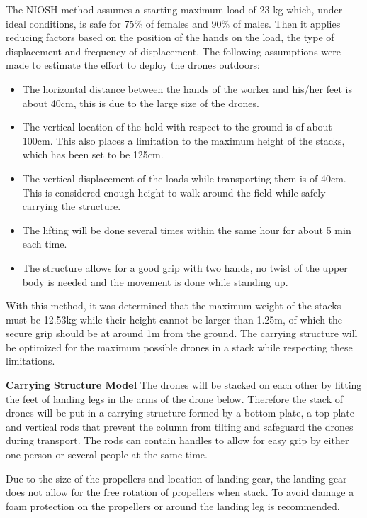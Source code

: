 The NIOSH method assumes a starting maximum load of 23 kg which, under ideal conditions, is safe for 75\% of females and 90\% of males. Then it applies reducing factors based on the position of the hands on the load, the type of displacement and frequency of displacement. The following assumptions were made to estimate the effort to deploy the drones outdoors:

\begin{itemize}[noitemsep, nolistsep]
    \item The horizontal distance between the hands of the worker and his/her feet is about 40cm, this is due to the large size of the drones.
    \item The vertical location of the hold with respect to the ground is of about 100cm. This also places a limitation to the maximum height of the stacks, which has been set to be 125cm. 
    \item The vertical displacement of the loads while transporting them is of 40cm. This is considered enough height to walk around the field while safely carrying the structure.
    \item The lifting will be done several times within the same hour for about 5 min each time. 
    \item The structure allows for a good grip with two hands, no twist of the upper body is needed and the movement is done while standing up. 
\end{itemize}

With this method, it was determined that the maximum weight of the stacks must be 12.53kg while their height cannot be larger than 1.25m, of which the secure grip should be at around 1m from the ground. The carrying structure will be optimized for the maximum possible drones in a stack while respecting these limitations.

\textbf{Carrying Structure Model} \newline
The drones will be stacked on each other by fitting the feet of landing legs in the arms of the drone below. Therefore the stack of drones will be put in a carrying structure formed by a bottom plate, a top plate and vertical rods that prevent the column from tilting and safeguard the drones during transport. The rods can contain handles to allow for easy grip by either one person or several people at the same time. 

Due to the size of the propellers and location of landing gear, the landing gear does not allow for the free rotation of propellers when stack. To avoid damage a foam protection on the propellers or around the landing leg is recommended.

